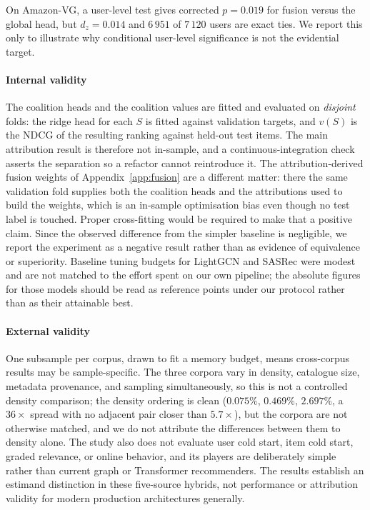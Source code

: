 \documentclass[pdflatex,sn-basic,Numbered]{sn-jnl}
\theoremstyle{plain}
\theoremstyle{definition}
\begin{document}
On Amazon-VG, a user-level test gives corrected $p=0.019$ for fusion versus the
global head, but $d_z=0.014$ and $6\,951$ of $7\,120$ users are exact ties. We
report this only to illustrate why conditional user-level significance is not
the evidential target.

\paragraph{Internal validity}
The coalition heads and the coalition values are fitted and evaluated on
\emph{disjoint} folds: the ridge head for each $S$ is fitted against validation
targets, and $v(S)$ is the NDCG of the resulting ranking against held-out test
items. The main attribution result is therefore not in-sample, and a
continuous-integration check asserts the separation so a refactor cannot
reintroduce it. The attribution-derived fusion weights of
Appendix~\ref{app:fusion} are a different matter: there the same validation
fold supplies both the coalition heads and the attributions used to build the
weights, which is an in-sample optimisation bias even though no test label is
touched. Proper cross-fitting would be required to make that a positive claim.
Since the observed difference from the simpler baseline is negligible, we
report the experiment as a negative result rather than as evidence of
equivalence or superiority. Baseline tuning
budgets for LightGCN and SASRec were modest and are not matched to the effort
spent on our own pipeline; the absolute figures for those models should be read
as reference points under our protocol rather than as their attainable best.

\paragraph{External validity}
One subsample per corpus, drawn to fit a memory budget, means cross-corpus
results may be sample-specific. The three corpora vary in density, catalogue
size, metadata provenance, and sampling simultaneously, so this is not a
controlled density comparison; the density ordering is clean ($0.075\%$, $0.469\%$, $2.697\%$, a $36\times$ spread with no adjacent pair closer than $5.7\times$), but the corpora are not otherwise matched, and we do not
attribute the differences between them to density alone. The study also does
not evaluate user cold start, item cold start, graded relevance, or online
behavior, and its players are deliberately simple rather than current graph or
Transformer recommenders. The results establish an estimand distinction in
these five-source hybrids, not performance or attribution validity for modern
production architectures generally.
\end{document}
